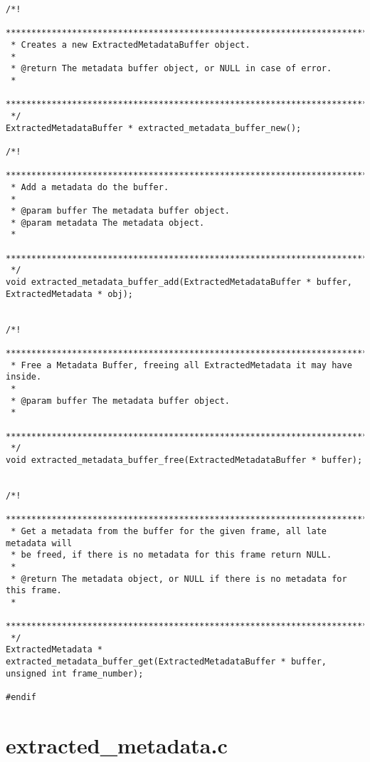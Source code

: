 \begin{lstlisting}
/*!
 *******************************************************************************
 * Creates a new ExtractedMetadataBuffer object. 
 *
 * @return The metadata buffer object, or NULL in case of error.
 *
 *******************************************************************************
 */
ExtractedMetadataBuffer * extracted_metadata_buffer_new();

/*!
 *******************************************************************************
 * Add a metadata do the buffer. 
 *
 * @param buffer The metadata buffer object.
 * @param metadata The metadata object.
 *
 *******************************************************************************
 */
void extracted_metadata_buffer_add(ExtractedMetadataBuffer * buffer, ExtractedMetadata * obj);


/*!
 *******************************************************************************
 * Free a Metadata Buffer, freeing all ExtractedMetadata it may have inside. 
 *
 * @param buffer The metadata buffer object.
 *
 *******************************************************************************
 */
void extracted_metadata_buffer_free(ExtractedMetadataBuffer * buffer);


/*!
 *******************************************************************************
 * Get a metadata from the buffer for the given frame, all late metadata will
 * be freed, if there is no metadata for this frame return NULL.
 *
 * @return The metadata object, or NULL if there is no metadata for this frame.
 *
 *******************************************************************************
 */
ExtractedMetadata * extracted_metadata_buffer_get(ExtractedMetadataBuffer * buffer, unsigned int frame_number);

#endif

\end{lstlisting}



\section{extracted\_metadata.c}

